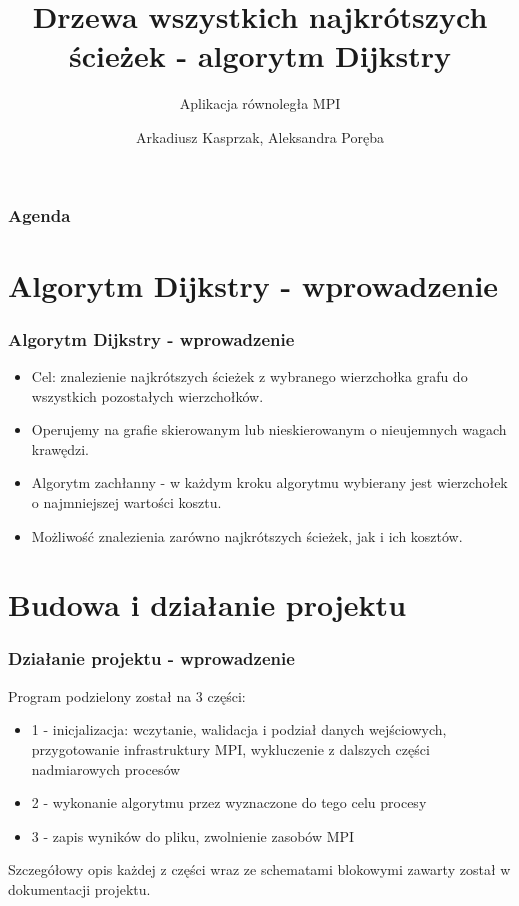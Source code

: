 \documentclass[10pt]{beamer}
\title{Drzewa wszystkich najkrótszych ścieżek - algorytm Dijkstry}
\subtitle{\normalsize{Aplikacja równoległa MPI}}
\date{}
\author{\normalsize{Arkadiusz Kasprzak, Aleksandra Poręba}}
\begin{document}
\titleframe[pl]

\begin{frame}
\frametitle{Agenda}
\tableofcontents
\end{frame}

\section{Algorytm Dijkstry - wprowadzenie}

\begin{frame}
\frametitle{Algorytm Dijkstry - wprowadzenie}
\begin{itemize}
\item Cel: znalezienie najkrótszych ścieżek z wybranego wierzchołka grafu do wszystkich pozostałych wierzchołków.
\item Operujemy na grafie skierowanym lub nieskierowanym o nieujemnych wagach krawędzi.
\item Algorytm zachłanny - w każdym kroku algorytmu wybierany jest wierzchołek o najmniejszej wartości kosztu.
\item Możliwość znalezienia zarówno najkrótszych ścieżek, jak i ich kosztów.
\end{itemize}
\end{frame}

\section{Budowa i działanie projektu}

\begin{frame}
\frametitle{Działanie projektu - wprowadzenie}
Program podzielony został na 3 części:
\begin{itemize}
\item 1 - inicjalizacja: wczytanie, walidacja i podział danych wejściowych, przygotowanie infrastruktury MPI, wykluczenie z dalszych części nadmiarowych procesów
\item 2 - wykonanie algorytmu przez wyznaczone do tego celu procesy
\item 3 - zapis wyników do pliku, zwolnienie zasobów MPI
\end{itemize}
Szczegółowy opis każdej z części wraz ze schematami blokowymi zawarty został w dokumentacji projektu.
\end{frame}
\end{document}
